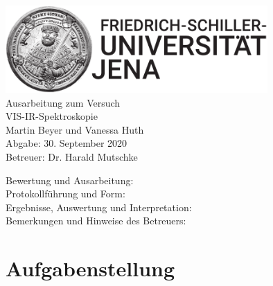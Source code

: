 \documentclass[a4paper,twoside,final]{article}
\begin{document}
\setlength{\marginparsep}{2em}
\renewcommand{\theequation}{\arabic{section}.\arabic{equation}}
\renewcommand{\thefigure}{\arabic{section}.\arabic{figure}}
\renewcommand{\thetable}{\arabic{section}.\arabic{table}}

\begin{center}
\thispagestyle{empty}
  \includegraphics[width=0.75\textwidth]{../UniJena_BildWortMarke_black.pdf}\\[4em]
  \Large
  Ausarbeitung zum Versuch\\[2em]
  \Huge
  VIS-IR-Spektroskopie\\
  \vspace{2cm}
  \Large
  Martin Beyer und Vanessa Huth\\[2em]
  Abgabe: 30. September 2020\\[2em]
  Betreuer: Dr. Harald Mutschke\\[5em]
  \begin{flushleft}
  	Bewertung und Ausarbeitung:\\[2em]
		Protokollführung und Form:\\[1em]
		Ergebnisse, Auswertung und Interpretation:\\[1em]
		Bemerkungen und Hinweise des Betreuers:
  \end{flushleft}
\end{center}
\clearpage

\pagestyle{fancy}
\renewcommand{\headrulewidth}{0pt}
\renewcommand{\footrulewidth}{0.5pt}
\renewcommand{\sectionmark}[1]{\markright{#1}}
\fancyhead[RE,LO]{\rightmark}
\fancyfoot[LE,RO]{\bfseries\thepage}
\renewcommand{\headrulewidth}{0.5pt}
\renewcommand{\footrulewidth}{0.5pt}

\setcounter{equation}{0}
\setcounter{figure}{0}

\tableofcontents
\newpage
\section{Aufgabenstellung} \label{sec:Aufgabenstellung}
\end{document}
